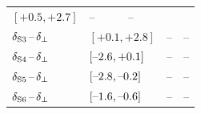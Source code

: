 \begin{table}[htbp]
\begin{tabular}{lllcc}
{                                           %
                                           $[\text{+0.5},   \text{+2.7}]$}    &  --  &  --  \\
    $\delSperp[3]$  &   \multicolumn{2}{l}{%
                                           $[\text{+0.1},   \text{+2.8}]$}    &  --  &  --  \\
    $\delSperp[4]$  &   \multicolumn{2}{l}{%
                                           $[\text{\tm2.6}, \text{+0.1}]$}    &  --  &  --  \\
    $\delSperp[5]$  &   \multicolumn{2}{l}{%
                                           $[\text{\tm2.8}, \text{\tm0.2}]$}  &  --  &  --  \\
    $\delSperp[6]$  &   \multicolumn{2}{l}{%
                                           $[\text{\tm1.6}, \text{\tm0.6}]$}  &  --  &  --  \\
    \hline
  \end{tabular}
\end{table}

